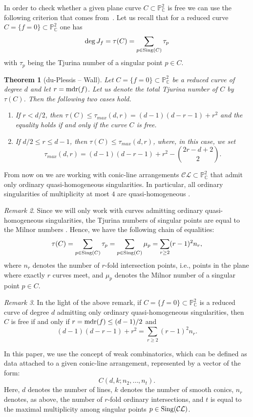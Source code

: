 \documentclass[11pt]{article}
\theoremstyle{plain}
\newtheorem{theorem}{Theorem}[section]
\theoremstyle{definition}
\theoremstyle{remark}
\newtheorem{remark}[theorem]{Remark}
\begin{document}
In order to check whether a given plane curve $C\subset \mathbb{P}^{2}_{\mathbb{C}}$ is free we can use the following criterion that comes from~\cite{duP}. Let us recall that for a reduced curve $C = \{f=0\}\subset \mathbb{P}^{2}_{\mathbb{C}}$ one has
$${\rm deg} \, J_{f} = \tau(C) = \sum_{p \in {\rm Sing}(C)} \tau_{p}$$
with $\tau_{p}$ being the Tjurina number of a singular point $p \in C$.
\begin{theorem}[du-Plessis -- Wall]
\label{dup}
Let $C = \{f=0\}\subset \mathbb{P}^{2}_{\mathbb{C}}$ be a reduced curve of degree $d$ and let $r = {\rm mdr}(f)$. Let us denote the total Tjurina number of $C$ by $\tau(C)$.
Then the following two cases hold.
\begin{enumerate}
\item[a)] If $r < d/2$, then $\tau(C) \leq \tau_{max}(d,r)= (d-1)(d-r-1)+r^2$ and the equality holds if and only if the curve $C$ is free.
\item[b)] If $d/2 \leq r \leq d-1$, then
$\tau(C) \leq \tau_{max}(d,r)$,
where, in this case, we set
$$\tau_{max}(d,r)=(d-1)(d-r-1)+r^2- \binom{2r-d+2}{2}.$$
\end{enumerate}
\end{theorem}
From now on we are working with conic-line arrangements $\mathcal{CL}\subset \mathbb{P}^{2}_{\mathbb{C}}$ that admit only ordinary quasi-homogeneous singularities. In particular, all ordinary singularities of multiplicity at most $4$ are quasi-homogeneous \cite[Exercise 7.31]{RCS}.
\begin{remark}
Since we will only work with curves admitting ordinary quasi-homogeneous singularities, the Tjurina numbers of singular points are equal to the Milnor numbers \cite{Reiffen}. Hence, we have the following chain of equalities:
$$\tau(C) = \sum_{p \in {\rm Sing}(C)} \tau_{p} = \sum_{p \in {\rm Sing}(C)} \mu_{p} = \sum_{r\geq 2}(r-1)^{2}n_{r},$$
where $n_{r}$ denotes the number of $r$-fold intersection points, i.e., points in the plane where exactly $r$ curves meet, and $\mu_p$ denotes the Milnor number of a singular point $p \in C$.
\end{remark}
\begin{remark}
In the light of the above remark, if $C=\{f=0\}\subset \mathbb{P}^{2}_{\mathbb{C}}$ is a reduced curve of degree $d$ admitting only ordinary quasi-homogeneous singularities, then $C$ is free if and only if $r={\rm mdr}(f) \leq (d-1)/2$ and 
\begin{equation}
\label{DPW}
(d-1)(d-r-1)+r^2 = \sum_{r\geq 2}(r-1)^{2}n_{r}.
\end{equation}
\end{remark}
In this paper, we use the concept of weak combinatorics, which can be defined as data attached to a given conic-line arrangement, represented by a vector of the form:  
$$C(d,k;n_2, \ldots, n_t).$$ Here, $d$ denotes the number of lines, $k$ denotes the number of smooth conics, $n_r$ denotes, as above, the number of $r$-fold ordinary intersections, and $t$ is equal to the maximal multiplicity among singular points $p \in {\rm Sing}(\mathcal{CL})$.
\end{document}
